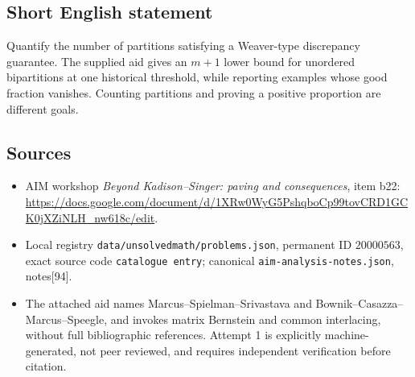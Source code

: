 \documentclass[11pt]{article}
\begin{document}
\subsection{Short English statement}
Quantify the number of partitions satisfying a Weaver-type discrepancy guarantee. The supplied aid gives an \(m+1\) lower bound for unordered bipartitions at one historical threshold, while reporting examples whose good fraction vanishes. Counting partitions and proving a positive proportion are different goals.
\subsection{Sources}
\begin{itemize}
\item AIM workshop \emph{Beyond Kadison--Singer: paving and consequences}, item b22: \url{https://docs.google.com/document/d/1XRw0WyG5PshqboCp99tovCRD1GCK0jXZiNLH_nw618c/edit}.
\item Local registry \texttt{data/unsolvedmath/problems.json}, permanent ID \(20000563\), exact source code \texttt{catalogue entry}; canonical \texttt{aim-analysis-notes.json}, notes[94].
\item The attached aid names Marcus--Spielman--Srivastava and Bownik--Casazza--Marcus--Speegle, and invokes matrix Bernstein and common interlacing, without full bibliographic references. Attempt 1 is explicitly machine-generated, not peer reviewed, and requires independent verification before citation.
\end{itemize}
\end{document}
